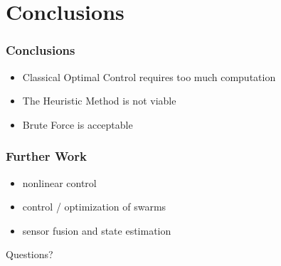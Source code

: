 \documentclass{beamer}
\begin{document}
\section{Conclusions}%


\begin{frame}

\frametitle{Conclusions}
\begin{itemize}
\item Classical Optimal Control requires too much computation
\item The Heuristic Method is not viable
\item Brute Force is acceptable

\end{itemize}
\end{frame}


\begin{frame}
\frametitle{ Further Work }
\begin{itemize}
\item nonlinear control
\item control / optimization of swarms
\item sensor fusion and state estimation
\end{itemize}
\end{frame}




\begin{frame}
\Huge{\centerline{Questions?}}
\end{frame}

\end{document}
